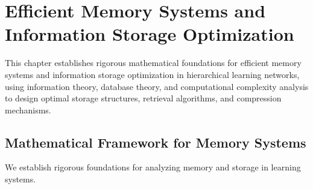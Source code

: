 \chapter{Efficient Memory Systems and Information Storage Optimization}

\begin{tcolorbox}[colback=DarkSkyBlue!5!white,colframe=DarkSkyBlue!75!black,title=Chapter Summary]
This chapter establishes rigorous mathematical foundations for efficient memory systems and information storage optimization in hierarchical learning networks, using information theory, database theory, and computational complexity analysis to design optimal storage structures, retrieval algorithms, and compression mechanisms.
\end{tcolorbox}

\section{Mathematical Framework for Memory Systems}

We establish rigorous foundations for analyzing memory and storage in learning systems.

